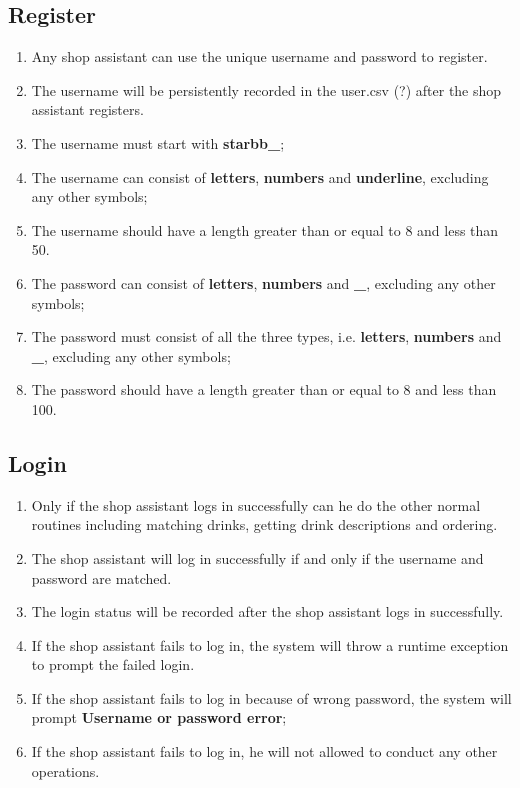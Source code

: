 \documentclass[a4paper]{report}
\begin{document}
\subsection{Register}
\begin{enumerate}
\item Any shop assistant can use the unique username and password to register.
\item The username will be persistently recorded in the user.csv (?) after the shop assistant registers.
\item The username must start with \textbf{starbb\_};
\item The username can consist of \textbf{letters}, \textbf{numbers} and \textbf{underline}, excluding any other symbols;
\item The username should have a length greater than or equal to 8 and less than 50.
\item The password can consist of \textbf{letters}, \textbf{numbers} and \textbf{\_}, excluding any other symbols;
\item The password must consist of all the three types, i.e. \textbf{letters}, \textbf{numbers} and \textbf{\_}, excluding any other symbols;
\item The password should have a length greater than or equal to 8 and less than 100.
\end{enumerate}

\subsection{Login}
\begin{enumerate}
\item Only if the shop assistant logs in successfully can he do the other normal routines including matching drinks, getting drink descriptions and ordering.
\item The shop assistant will log in successfully if and only if the username and password are matched.
\item The login status will be recorded after the shop assistant logs in successfully.
\item If the shop assistant fails to log in, the system will throw a runtime exception to prompt the failed login.
\item If the shop assistant fails to log in because of wrong password, the system will prompt \textbf{Username or password error};
\item If the shop assistant fails to log in, he will not allowed to conduct any other operations.
\end{enumerate}
\end{document}
